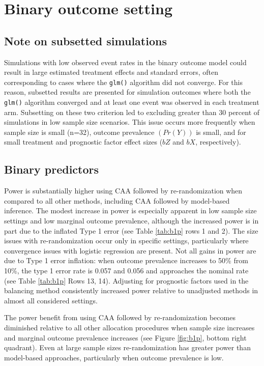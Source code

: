 \section{Binary outcome setting}
\subsection{Note on subsetted simulations}
Simulations with low observed event rates in the binary outcome model could result in large estimated treatment effects and standard errors, often corresponding to cases where the \texttt{glm()} algorithm did not converge.
For this reason, subsetted results are presented for simulation outcomes where both the \texttt{glm()} algorithm converged and at least one event was observed in each treatment arm.
Subsetting on these two criterion led to excluding greater than 30 percent of simulations in low sample size scenarios.
This issue occurs more frequently when sample size is small (n=32), outcome prevalence $(Pr(Y))$ is small, and for small treatment and prognostic factor effect sizes ($bZ$ and $bX$, respectively). 

\subsection{Binary predictors}
Power is substantially higher using CAA followed by re-randomization when compared to all other methods, including CAA followed by model-based inference.
The modest increase in power is especially apparent in low sample size settings and low marginal outcome prevalence, although the increased power is in part due to the inflated Type 1 error (see Table \ref{tab:b1p} rows 1 and 2).
The size issues with re-randomization occur only in specific settings, particularly where convergence issues with logistic regression are present.
Not all gains in power are due to Type 1 error inflation: when outcome prevalence increases to 50\% from 10\%, the type 1 error rate is 0.057 and 0.056 and approaches the nominal rate (see Table \ref{tab:b1p} Rows 13, 14).
Adjusting for prognostic factors used in the balancing method consistently increased power relative to unadjusted methods in almost all considered settings.

The power benefit from using CAA followed by re-randomization becomes diminished relative to all other allocation procedures when sample size increases and marginal outcome prevalence increases (see Figure \ref{fig:b1p}, bottom right quadrant).
Even at large sample sizes re-randomization has greater power than model-based approaches, particularly when outcome prevalence is low.


